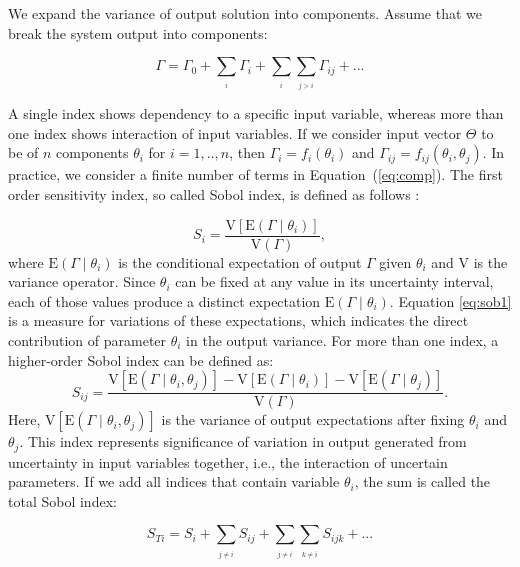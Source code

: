 We expand the variance of output solution into
components. Assume that we break the system output into components:

\begin{equation}
\Gamma=\Gamma_{0}+\underset{_{i}}{\sum}\Gamma_{i}+\underset{_{i}}{\sum}\underset
{_{j>i}}{\sum}\Gamma_{ij}+...\label{eq:comp}\end{equation}

A single index shows dependency to a specific input variable, whereas more than
one index shows interaction of input variables. If we consider input vector
$\Theta$ to be of $n$ components $\theta_{i}$ for $i=1,..,n$, then
$\Gamma_{i}=f_{i}(\theta_{i})$ and $\Gamma_{ij}=f_{ij}(\theta_{i},\theta_{j})$.
In practice, we consider a finite number of terms in Equation~(\ref{eq:comp}).
 The first order sensitivity index, so called Sobol index, is defined as follows
\cite{saltelli2007global}:

\begin{equation}
S_{i}=\frac{\mbox{V}[\mbox{E}(\Gamma\mid\theta_{i})]}{\mbox{V}(\Gamma)},
\label{eq:sob1}\end{equation} where $\mbox{E}(\Gamma\mid\theta_{i})$ is the
conditional
expectation of output $\Gamma$ given $\theta_{i}$ and $\mbox{V}$ is the variance
operator. Since $\theta_{i}$ can be fixed at any value in its uncertainty
interval, each of those values produce a distinct expectation
$\mbox{E}(\Gamma\mid\theta_{i})$. Equation \ref{eq:sob1} is a measure for
variations of these expectations, which indicates the direct contribution of
parameter $\theta_i$ in the output variance. For more than one index, a
higher-order Sobol index can be defined as:\begin{equation}
S_{ij}=\frac{\mbox{V}[\mbox{E}(\Gamma\mid\theta_{i},\theta_{j})]-\mbox{V}[\mbox{
E}(\Gamma\mid\theta_{i})]-\mbox{V}[\mbox{E}(\Gamma\mid\theta_{j})]}{\mbox{V}
(\Gamma)}.\label{eq:sob2}\end{equation} Here,
$\mbox{V}[\mbox{E}(\Gamma\mid\theta_{i},\theta_{j})]$ is the variance of output
expectations after fixing $\theta_{i}$ and $\theta_{j}$. This index represents
significance of variation in output generated from uncertainty in input 
variables together, i.e., the interaction of uncertain parameters. If we add all
indices that contain variable $\theta_{i}$, the sum is called the total Sobol
index:

\begin{equation}
S_{Ti}=S_{i}+\underset{_{j\neq i}}{\sum}S_{ij}+\underset{_{j\neq
i}}{\sum}\underset{_{k\neq i}}{\sum}S_{ijk}+...\label{eq:totSob}\end{equation}

